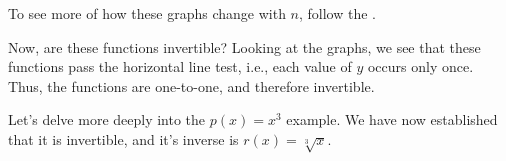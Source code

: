 \documentclass{ximera}
\begin{document}
\begin{image}
\end{image}

To see more of how these graphs change with $n$, follow the 
.



Now, are these functions invertible? Looking at the graphs, we see that these functions pass the horizontal line test, i.e., each value of $y$ occurs only once. Thus, the functions are one-to-one, and therefore invertible.

Let's delve more deeply into the $p(x) = x^3$ example. We have now established that it is invertible, and it's inverse is $r(x)=\sqrt[3]{x}$. 
\end{document}
